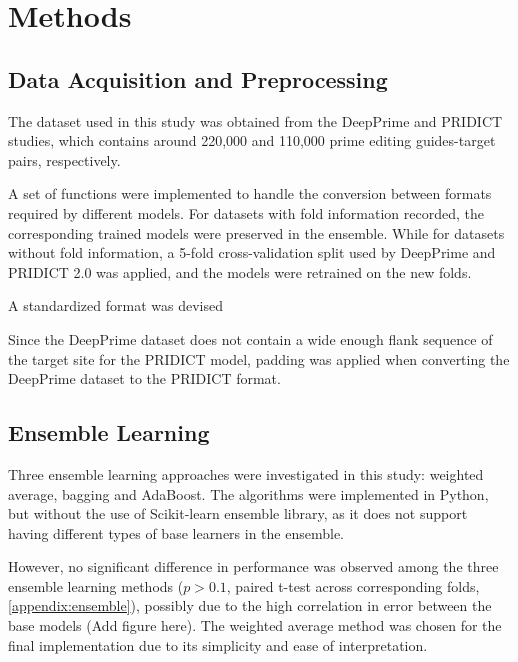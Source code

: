\section{Methods}

\subsection*{Data Acquisition and Preprocessing}

The dataset used in this study was obtained from the DeepPrime and PRIDICT studies\cite{mathisPredictingPrimeEditing2023,mathisMachineLearningPrediction2024,yuPredictionEfficienciesDiverse2023}, which contains around 220,000 and 110,000 prime editing guides-target pairs, respectively.

A set of functions were implemented to handle the conversion between formats required by different models. For datasets with fold information recorded, the corresponding trained models were preserved in the ensemble. While for datasets without fold information, a 5-fold cross-validation split used by DeepPrime and PRIDICT 2.0 was applied, and the models were retrained on the new folds.

A standardized format was devised 

Since the DeepPrime dataset does not contain a wide enough flank sequence of the target site for the PRIDICT model, padding was applied when converting the DeepPrime dataset to the PRIDICT format. 

\subsection*{Ensemble Learning}

Three ensemble learning approaches were investigated in this study: weighted average, bagging and AdaBoost. The algorithms were implemented in Python, but without the use of Scikit-learn ensemble library, as it does not support having different types of base learners in the ensemble.  


However, no significant difference in performance was observed among the three ensemble learning methods ($p>0.1$, paired t-test across corresponding folds, \autoref{appendix:ensemble}), possibly due to the high correlation in error between the base models (Add figure here). The weighted average method was chosen for the final implementation due to its simplicity and ease of interpretation.
